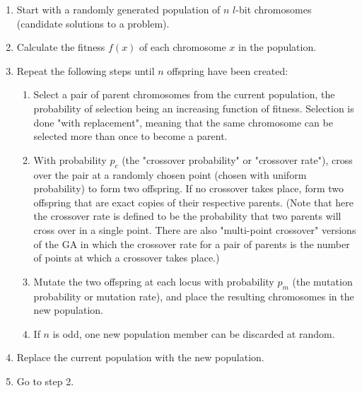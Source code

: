 \begin{enumerate}
    \item Start with a randomly generated population of $n$ $l$-bit chromosomes (candidate solutions to a problem).
    \item Calculate the fitness $f(x)$ of each chromosome $x$ in the population.
    \item Repeat the following steps until $n$ offspring have been created:
    \begin{enumerate}
        \item Select a pair of parent chromosomes from the current population, the probability of selection being an increasing function of fitness. Selection is done "with replacement", meaning that the same chromosome can be selected more than once to become a parent.
        \item With probability $p_c$ (the "crossover probability" or "crossover rate"), cross over the pair at a randomly chosen point (chosen with uniform probability) to form two offspring. If no crossover takes place, form two offspring that are exact copies of their respective parents. (Note that here the crossover rate is defined to be the probability that two parents will cross over in a single point. There are also "multi-point crossover" versions of the GA in which the crossover rate for a pair of parents is the number of points at which a crossover takes place.)
        \item Mutate the two offspring at each locus with probability $p_m$ (the mutation probability or mutation rate), and place the resulting chromosomes in the new population.
        \item If $n$ is odd, one new population member can be discarded at random.
    \end{enumerate}
    \item Replace the current population with the new population.
    \item Go to step 2.


\end{enumerate}